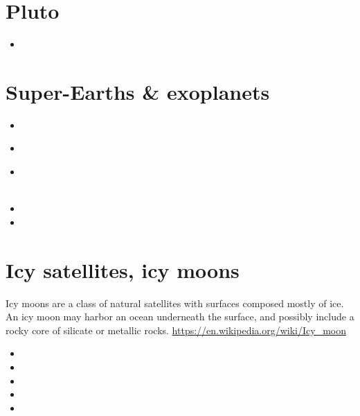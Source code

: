 \section{Pluto}

\begin{scriptsize}
\begin{itemize}
\item[\twothousandsixteen] 
\end{itemize}
\end{scriptsize}

\section{Super-Earths \& exoplanets}

\begin{scriptsize}
\begin{itemize}
\item[\twothousandeleven]
  \\
\item[\twothousandthirteen]
\item[\twothousandfifteen] 
  \\
  \\
\item[\twothousandtwentyone]
\item[\twothousandtwentythree] 
\end{itemize}
\end{scriptsize}

\section{Icy satellites, icy moons}

Icy moons are a class of natural satellites with surfaces composed mostly of ice. 
An icy moon may harbor an ocean underneath the surface, and possibly include a rocky 
core of silicate or metallic rocks.
\url{https://en.wikipedia.org/wiki/Icy_moon}

\begin{scriptsize}
\begin{itemize}
\item[\twothousandone] 
\item[\twothousandtwelve] 
\item[\twothousandseventeen] 
\item[\twothousandnineteen] 
\item[\twothousandtwenty] 
\end{itemize}
\end{scriptsize}


